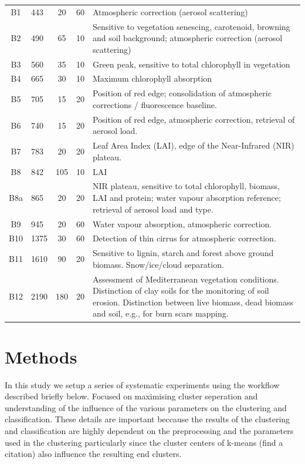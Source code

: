 \documentclass[journal,article,submit,pdftex,moreauthors]{Definitions/mdpi}
\begin{document}
\begin{small}
\begin{longtable}{clccp{3cm}}
	B1 & 443 & 20 & 60 & Atmospheric correction (aerosol scattering) \\
	B2 & 490 & 65 & 10 & Sensitive to vegetation senescing, carotenoid, browning and soil background; atmospheric correction (aerosol scattering) \\
	B3 & 560 & 35 & 10 & Green peak, sensitive to total chlorophyll in vegetation \\
	B4 & 665 & 30 & 10 & Maximum chlorophyll absorption \\
	B5 & 705 & 15 & 20 & Position of red edge; consolidation of atmospheric corrections / fluorescence baseline. \\
	B6 & 740 & 15 & 20 & Position of red edge, atmospheric correction, retrieval of aerosol load. \\
	B7 & 783 & 20 & 20 & Leaf Area Index (LAI), edge of the Near-Infrared (NIR) plateau. \\
	B8 & 842 & 105 & 10 & LAI \\
	B8a & 865 & 20 & 20 & NIR plateau, sensitive to total chlorophyll, biomass, LAI and protein; water vapour absorption reference; retrieval of aerosol load and type. \\
	B9 & 945 & 20 & 60 & Water vapour absorption, atmospheric correction. \\
	B10 & 1375 & 30 & 60 & Detection of thin cirrus for atmospheric correction. \\
	B11 & 1610 & 90 & 20 & Sensitive to lignin, starch and forest above ground biomass. Snow/ice/cloud separation. \\
	B12 & 2190 & 180 & 20 & Assessment of Mediterranean vegetation conditions. Distinction of clay soils for the monitoring of soil erosion. Distinction between live biomass, dead biomass and soil, e.g., for burn scars mapping. \\
	
	\end{longtable}
\end{small}
\section{Methods}
In this study we setup a series of systematic experiments using the workflow described briefly below. Focused on maximising cluster seperation and understanding of the influence of the various parameters on the clustering and classification.
These details are important beccause the results of the clustering and classification are highly dependent on the preprocessing and the parameters used in the clustering particularly since the cluster centers of k-means (find a citation) also influence 
the resulting end clusters.
\end{document}
